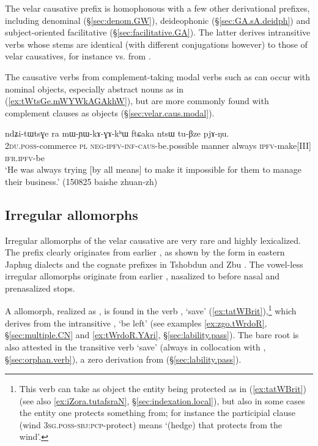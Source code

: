 The velar causative  prefix is homophonous with a few other derivational prefixes, including denominal (§\ref{sec:denom.GW}), deideophonic (§\ref{sec:GA.sA.deidph}) and subject-oriented facilitative (§\ref{sec:facilitative.GA}). The latter derives intransitive verbs whose stems are identical (with different conjugations however) to those of velar causatives, for instance  vs.   from .
  

The causative verbs from com\-ple\-ment-taking modal verbs such as  can occur with nominal objects, especially abstract nouns as in (\ref{ex:tWtsGe.mWYWkAGAkhW}), but are more commonly found with complement clauses as objects (§\ref{sec:velar.caus.modal}).
\largerpage
\begin{exe}
\ex \label{ex:tWtsGe.mWYWkAGAkhW}
 \gll ndʑi-tɯtsɣe ra mɯ-ɲɯ-kɤ-ɣɤ-kʰɯ ftɕaka ntsɯ tu-βze pjɤ-ŋu. \\
 \textsc{2du}.\textsc{poss}-commerce \textsc{pl} \textsc{neg}-\textsc{ipfv}-\textsc{inf}-\textsc{caus}-be.possible manner always \textsc{ipfv}-make[III] \textsc{ifr}.\textsc{ipfv}-be \\
 \glt `He was always trying [by all means] to make it impossible for them to manage their business.' (150825 baishe zhuan-zh)
\end{exe} 

\subsection{Irregular allomorphs} \label{sec:causative.m}
Irregular allomorphs of the velar causative are very rare and highly lexicalized. The  prefix clearly originates from earlier , as shown by the form  in eastern Japhug dialects and the cognate prefixes  in Tshobdun and Zbu \citep{jackson14morpho}.  The vowel-less irregular allomorphs originate from earlier , nasalized to  before nasal and prenasalized stops. 

A  allomorph, realized as , is found in the verb , `save' (\ref{ex:tatWBrit}),\footnote{This verb can take as object the entity being protected as in (\ref{ex:tatWBrit}) (see also \ref{ex:iZora.tutafsraN}, §\ref{sec:indexation.local}), but also in some cases the entity one protects something from; for instance the participial clause  (wind \textsc{3sg}.\textsc{poss}-\textsc{sbj}:\textsc{pcp}-protect) means `(hedge) that protects from the wind'. } which derives from the intransitive , `be left' (see examples \ref{ex:zgo.tWrdoR}, §\ref{sec:multiple.CN} and \ref{ex:tWrdoR.YAri}, §\ref{sec:lability.pass}). The bare root  is also attested in the transitive verb  `save' (always in collocation with , §\ref{sec:orphan.verb}), a zero derivation from  (§\ref{sec:lability.pass}). 


